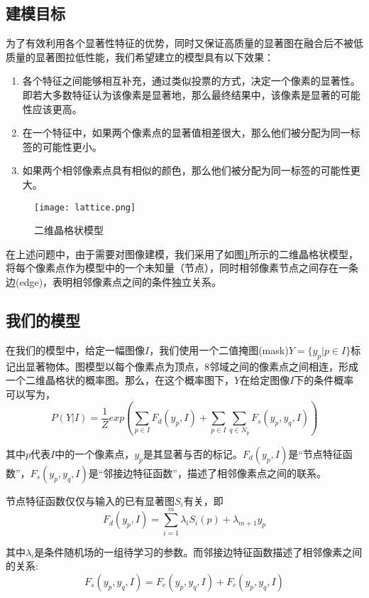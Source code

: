 \subsection{建模目标}
为了有效利用各个显著性特征的优势，同时又保证高质量的显著图在融合后不被低质量的显著图拉低性能，我们希望建立的模型具有以下效果：
\begin{enumerate}
\item 各个特征之间能够相互补充，通过类似投票的方式，决定一个像素的显著性。即若大多数特征认为该像素是显著地，那么最终结果中，该像素是显著的可能性应该更高。
\item 在一个特征中，如果两个像素点的显著值相差很大，那么他们被分配为同一标签的可能性更小。
\item 如果两个相邻像素点具有相似的颜色，那么他们被分配为同一标签的可能性更大。
\end{enumerate}

\begin{figure}
\centering
\texttt{[image: lattice.png]}
\caption{二维晶格状模型}\label{fig:lattice}
\end{figure}

在上述问题中，由于需要对图像建模，我们采用了如图\ref{fig:lattice}所示的二维晶格状模型，将每个像素点作为模型中的一个未知量（节点），同时相邻像素节点之间存在一条边(edge)，表明相邻像素点之间的条件独立关系。

\subsection{我们的模型}
在我们的模型中，给定一幅图像$I$，我们使用一个二值掩图(mask)$Y=\{y_p|p\in I\}$标记出显著物体。图模型以每个像素点为顶点，8邻域之间的像素点之间相连，形成一个二维晶格状的概率图。那么，在这个概率图下，$Y$在给定图像$I$下的条件概率可以写为，
\begin{equation}
P(Y|I) = \frac{1}{Z}exp(\sum_{p\in I}F_d(y_p, I) + \sum_{p\in I}\sum_{q\in N_p}F_s(y_p,y_q,I) )
\end{equation}

其中$p$代表$I$中的一个像素点，$y_p$是其显著与否的标记。$F_d(y_p, I)$是“节点特征函数”，$F_s(y_p,y_q,I)$是“邻接边特征函数”，描述了相邻像素点之间的联系。

节点特征函数仅仅与输入的已有显著图$S_i$有关，即
\begin{equation}
F_d(y_p, I) = \sum_{i=1}^{m} \lambda_iS_i(p) + \lambda_{m+1}y_p
\end{equation}

其中$\lambda_i$是条件随机场的一组待学习的参数。而邻接边特征函数描述了相邻像素之间的关系:
\begin{equation}
F_s(y_p,y_q,I) = F_e(y_p,y_q,I) + F_c(y_p,y_q,I)
\end{equation}

